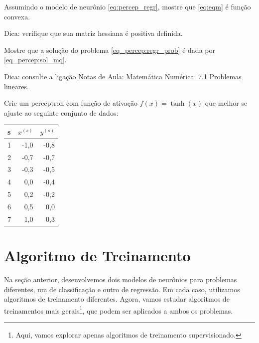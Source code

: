 \begin{exer}\label{exer:eqm_convexa}
  Assumindo o modelo de neurônio \eqref{eq:percep_regr}, mostre que \eqref{eq:eqm} é função convexa.
\end{exer}
\begin{resp}
  Dica: verifique que sua matriz hessiana é positiva definida.
\end{resp}

\begin{exer}\label{exer_percep:sol_mq}
  Mostre que a solução do problema \eqref{eq_percep:regr_prob} é dada por \eqref{eq_percep:sol_mq}.
\end{exer}
\begin{resp}
  Dica: consulte a ligação \href{https://notaspedrok.com.br/notas/MatematicaNumerica/cap_ajuste_sec_prob_lin.html}{Notas de Aula: Matemática Numérica: 7.1 Problemas lineares}.
\end{resp}

\begin{exer}
  Crie um perceptron com função de ativação $f(x)=\tanh(x)$ que melhor se ajuste ao seguinte conjunto de dados:
  \begin{center}
  \begin{tabular}{l|rr}
    s & $x^{(s)}$ & $y^{(s)}$\\\hline
    1 & -1,0 & -0,8 \\
    2 & -0,7 & -0,7 \\
    3 & -0,3 & -0,5 \\
    4 &  0,0 & -0,4 \\
    5 &  0,2 & -0,2 \\
    6 &  0,5 &  0,0 \\
    7 &  1,0 &  0,3 \\\hline
  \end{tabular}
\end{center}
\end{exer}

\section{Algoritmo de Treinamento}\label{cap_percepton_sec_train}

Na seção anterior, desenvolvemos dois modelos de neurônios para problemas diferentes, um de classificação e outro de regressão. Em cada caso, utilizamos algoritmos de treinamento diferentes. Agora, vamos estudar algoritmos de treinamentos mais gerais\footnote{Aqui, vamos explorar apenas algoritmos de treinamento supervisionado.}, que podem ser aplicados a ambos os problemas.

